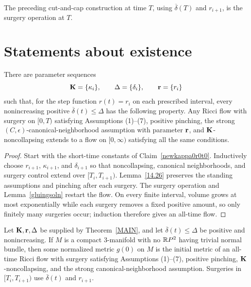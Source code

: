 \begin{definition}
\label{def:surgery-operation}

The preceding cut-and-cap construction at time $T$, using
$\overline\delta(T)$ and $r_{i+1}$, is the surgery operation at $T$.
\end{definition}

\section{Statements about existence}

\begin{theorem}
\label{thm:main-existence-ricci-flow-surgery}
\label{MAIN}

There are parameter sequences
\[
  {\bf K}=\{\kappa_i\},\qquad
  \Delta=\{\delta_i\},\qquad
  {\bf r}=\{r_i\}
\]
such that, for the step function $r(t)=r_i$ on each prescribed interval, every
nonincreasing positive $\overline\delta(t)\leq\Delta$ has the following
property. Any Ricci flow with surgery on $[0,T)$ satisfying Assumptions
(1)--(7), positive pinching, the strong $(C,\epsilon)$-canonical-neighborhood
assumption with parameter ${\bf r}$, and ${\bf K}$-noncollapsing extends to a
flow on $[0,\infty)$ satisfying all the same conditions.
\end{theorem}

\begin{proof}
\sketch
Start with the short-time constants of Claim~\ref{newkappa0r0t0}. Inductively
choose $r_{i+1}$, $\kappa_{i+1}$, and $\delta_{i+1}$ so that noncollapsing,
canonical neighborhoods, and surgery control extend over
$[T_i,T_{i+1})$. Lemma~\ref{14.26} preserves the standing assumptions and
pinching after each surgery. The surgery operation and
Lemma~\ref{gluingsoln} restart the flow. On every finite interval, volume grows
at most exponentially while each surgery removes a fixed positive amount, so
only finitely many surgeries occur; induction therefore gives an all-time
flow.
\end{proof}

\begin{corollary}
\label{cor:ricci-flow-surgery-exists-all-time}
\label{RFSexists}
Let ${\bf K},{\bf r},\Delta$ be supplied by Theorem~\ref{MAIN}, and let
$\overline\delta(t)\leq\Delta$ be positive and nonincreasing. If $M$ is a
compact $3$-manifold with no $\mathbb{R} P^2$ having trivial normal bundle, then some
normalized metric $g(0)$ on $M$ is the initial metric of an all-time Ricci flow
with surgery satisfying Assumptions (1)--(7), positive pinching,
${\bf K}$-noncollapsing, and the strong canonical-neighborhood assumption.
Surgeries in $[T_i,T_{i+1})$ use $\overline\delta(t)$ and $r_{i+1}$.
\end{corollary}

